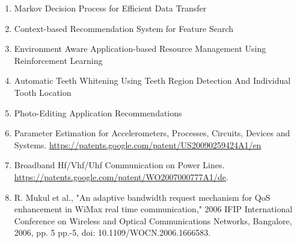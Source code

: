 
	
\begin{enumerate}
	\vspace{10pt}
	
	\item{ Markov Decision Process for Efficient Data Transfer}
	
	\item{Context-based Recommendation System for Feature Search}
	
	\item{Environment Aware Application-based Resource Management Using Reinforcement Learning}
	
	\item{ Automatic Teeth Whitening Using Teeth Region Detection And Individual Tooth Location}
	
	\item{Photo-Editing Application Recommendations}
	
	\item {Parameter Estimation for Accelerometers, Processes, Circuits, Devices and Systems. \href {https://patents.google.com/patent/US20090259424A1/en}{https://patents.google.com/patent/US20090259424A1/en}}
	
	\item{Broadband Hf/Vhf/Uhf Communication on Power Lines. \href{https://patents.google.com/patent/WO2007000777A1/de}{https://patents.google.com/patent/WO2007000777A1/de}.}
	
	\item {R. Mukul et al., "An adaptive bandwidth request mechanism for QoS enhancement in WiMax real time communication," 2006 IFIP International Conference on Wireless and Optical Communications Networks, Bangalore, 2006, pp. 5 pp.-5, doi: 10.1109/WOCN.2006.1666583.
	}
\end{enumerate}